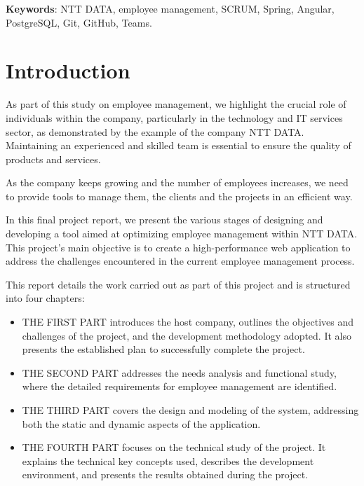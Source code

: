 \documentclass[12pt,a4paper,table,english]{article}
\begin{document}
	\textbf{Keywords}: NTT DATA, employee management, SCRUM, Spring, Angular,
	PostgreSQL, Git, GitHub, Teams.
	\pagebreak
	
	\tableofcontents
	\newpage
	
	
	\section {Introduction}
	As part of this study on employee management, we highlight the crucial role of individuals within the company, particularly in the technology and IT services sector, as demonstrated by the example of the company NTT DATA. Maintaining an experienced and skilled team is essential to ensure the quality of products and services.
	
	As the company keeps growing and the number of employees increases, we need to provide tools to manage them, the clients and the projects in an efficient way. 
	
	In this final project report, we present the various stages of designing and developing a tool aimed at optimizing employee management within NTT DATA. This project's main objective is to create a high-performance web application to address the challenges encountered in the current employee management process.
	
	This report details the work carried out as part of this project and is structured into four chapters:
	
	\begin{itemize}
		\item THE FIRST PART introduces the host company, outlines the objectives and challenges of the project, and the development methodology adopted. It also presents the established plan to successfully complete the project.
	
		\item THE SECOND PART addresses the needs analysis and functional study, where the detailed requirements for employee management are identified.
	
		\item THE THIRD PART covers the design and modeling of the system, addressing both the static and dynamic aspects of the application.
	
		\item THE FOURTH PART focuses on the technical study of the project. It explains the technical key concepts used, describes the development environment, and presents the results obtained during the project.
	\end{itemize}
	
\end{document}
